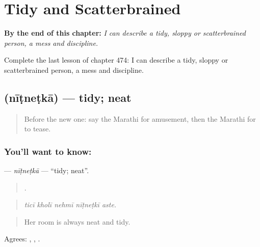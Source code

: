 
\chapter{Tidy and Scatterbrained}
\label{ch:mr-tidy-and-scatterbrained}

\begin{chapteropening}
\textbf{By the end of this chapter:} \emph{I can describe a tidy, sloppy or scatterbrained person, a mess and discipline.}

Complete the last lesson of chapter 474: I can describe a tidy, sloppy or scatterbrained person, a mess and discipline.
\end{chapteropening}

\section[\texorpdfstring{\mr{नीटनेटका} (nīṭneṭkā)}{नीटनेटका (nīṭneṭkā)}]{ (nīṭneṭkā) — tidy; neat}

\label{lesson:MR-C474-nitnetka}



\begin{quote}
Before the new one: say the Marathi for amusement, then the Marathi for to tease.
\end{quote}

\subsection*{You'll want to know: }
\textbf{} — \emph{nīṭneṭkā} — \textquotedblleft{}tidy; neat\textquotedblright{}.

\begin{quote}
    .
\end{quote}

\begin{quote}
\emph{ticī kholī nehmī nīṭneṭkī aste.}
\end{quote}

\begin{quote}
Her room is always neat and tidy.
\end{quote}

Agrees: , , .

